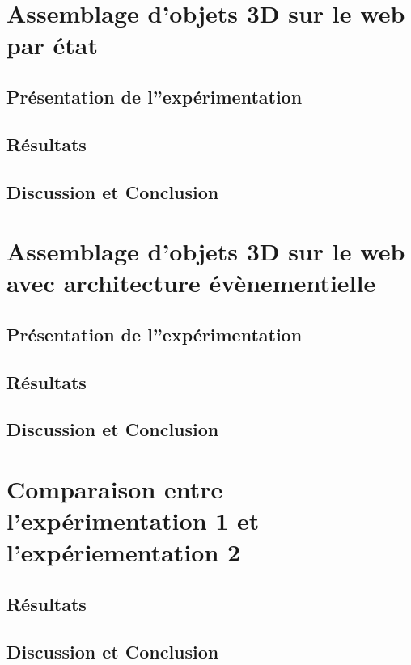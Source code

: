 
\section{Assemblage d'objets 3D sur le web par état}
\subsection{Présentation de l''expérimentation}
\subsection{Résultats}
\subsection{Discussion et Conclusion}

\section{Assemblage d'objets 3D sur le web avec architecture évènementielle}
\subsection{Présentation de l''expérimentation}
\subsection{Résultats}
\subsection{Discussion et Conclusion}

\section{Comparaison entre l'expérimentation 1 et l'expériementation 2}
\subsection{Résultats}
\subsection{Discussion et Conclusion}
